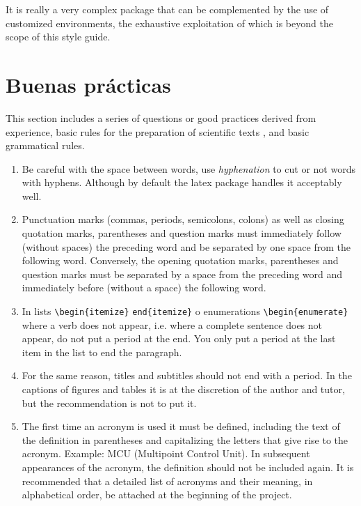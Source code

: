 

It is really a very complex package that can be complemented by the use of customized environments, the exhaustive exploitation of which is beyond the scope of this style guide.


\chapter {Buenas prácticas}

This section includes a series of questions or good practices derived from experience, basic rules for the preparation of scientific texts \cite{alba2009}, and basic grammatical rules.



\begin{enumerate}
    \item Be careful with the space between words, use \emph{hyphenation} to cut or not words with hyphens. Although by default the latex  package handles it acceptably well.

\item Punctuation marks (commas, periods, semicolons, colons) as well as closing quotation marks, parentheses and question marks must immediately follow (without spaces) the preceding word and be separated by one space from the following word.  Conversely, the opening quotation marks, parentheses and question marks must be separated by a space from the preceding word and immediately before (without a space) the following word.

\item In lists \lstinline[language=enparrafo]!\begin{itemize}! \lstinline[language=enparrafo]!end{itemize}! o enumerations \lstinline[language=enparrafo]!\begin{enumerate}!  where a verb does not appear, i.e. where a complete sentence does not appear, do not put a period at the end. You only put a period at the last item in the list to end the paragraph.

\item  For the same reason, titles and subtitles should not end with a period. In the captions of figures and tables it is at the discretion of the author and tutor, but the recommendation is not to put it.


\item The first time an acronym is used it must be defined, including the text of the definition in parentheses and capitalizing the letters that give rise to the acronym.  Example: MCU (Multipoint Control Unit).  In subsequent appearances of the acronym, the definition should not be included again.  It is recommended that a detailed list of acronyms and their meaning, in alphabetical order, be attached at the beginning of the project.






\end{enumerate}
